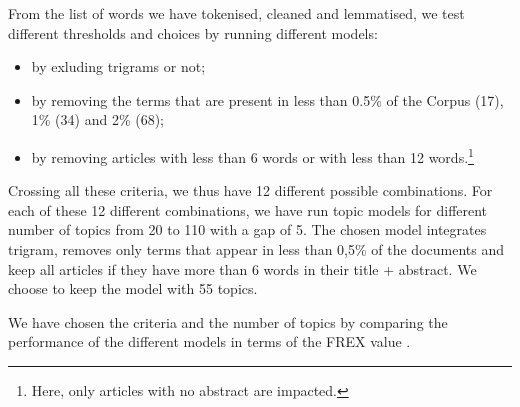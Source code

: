 \documentclass[]{elsarticle} %
\providecommand{\tightlist}{%
  \setlength{\itemsep}{0pt}\setlength{\parskip}{0pt}}
\begin{document}
From the list of words we have tokenised, cleaned and lemmatised, we
test different thresholds and choices by running different models:

\begin{itemize}
\tightlist
\item
  by exluding trigrams or not;
\item
  by removing the terms that are present in less than 0.5\% of the
  Corpus (17), 1\% (34) and 2\% (68);
\item
  by removing articles with less than 6 words or with less than 12
  words.\footnote{Here, only articles with no abstract are impacted.}
\end{itemize}

Crossing all these criteria, we thus have 12 different possible
combinations. For each of these 12 different combinations, we have run
topic models for different number of topics from 20 to 110 with a gap of
5. The chosen model integrates trigram, removes only terms that appear
in less than 0,5\% of the documents and keep all articles if they have
more than 6 words in their title + abstract. We choose to keep the model
with 55 topics.

We have chosen the criteria and the number of topics by comparing the
performance of the different models in terms of the FREX value
\citep{bischof2012}.


\end{document}
